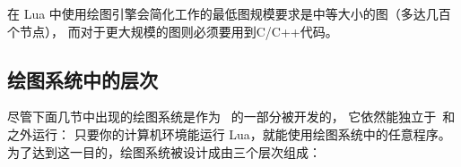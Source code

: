 在 Lua 中使用绘图引擎会简化工作的最低图规模要求是中等大小的图（多达几百个节点），
而对于更大规模的图则必须要用到C/C++代码。


\subsection{绘图系统中的层次}

\label{section-gd-layers}

尽管下面几节中出现的绘图系统是作为 \pgfname\ 的一部分被开发的，
它依然能独立于\pgfname\ 和\tikzname 之外运行：
只要你的计算机环境能运行 Lua，就能使用绘图系统中的任意程序。
为了达到这一目的，绘图系统被设计成由三个层次组成：


